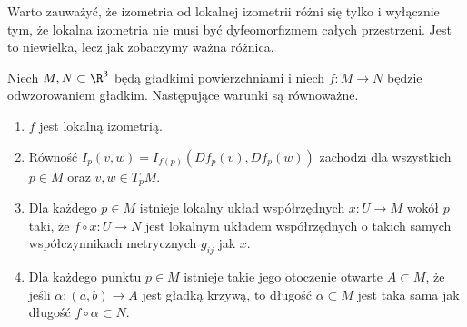 \begin{frame}[<+->]


\begin{uwaga}

Warto zauważyć, że izometria od lokalnej izometrii różni się tylko i wyłącznie tym, że lokalna izometria nie musi być dyfeomorfizmem całych przestrzeni. Jest to niewielka, lecz jak zobaczymy ważna różnica.

\end{uwaga}

\end{frame}
\begin{frame}[<+->]

\begin{lemat}\label{lem:loc-isometry-prop}
Niech $M,N\subset \R^3$ będą gładkimi powierzchniami i niech $f\colon M\to N$ będzie odwzorowaniem gładkim. Następujące warunki są równoważne.

\begin{enumerate}
\item $f$ jest lokalną izometrią.
\item Równość $I_p(v,w)=I_{f(p)}(Df_p(v),Df_p(w))$ zachodzi dla wszystkich $p\in M$ oraz $v,w\in T_pM$.

\item Dla każdego $p\in M$ istnieje lokalny układ współrzędnych $x\colon U\to M$ wokół $p$ taki, że $f\circ x\colon U\to N$ jest lokalnym układem współrzędnych o takich samych współczynnikach metrycznych $g_{ij}$ jak $x$.

\item Dla każdego punktu $p\in M$ istnieje takie jego otoczenie otwarte $A\subset M$, że jeśli $\alpha \colon(a,b)\to A$ jest gładką krzywą, to długość $\alpha\subset M$ jest taka sama jak długość $f\circ \alpha\subset N$.
\end{enumerate}
\end{lemat}
\end{frame}
